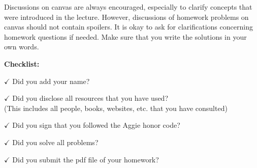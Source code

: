 \documentclass{article}
\theoremstyle{definition}
\newcommand{\checklist}{\noindent\textbf{Checklist:}
\begin{compactitem}[$\Box$] 
\item [$\checkmark$] Did you add your name? 
\item [$\checkmark$] Did you disclose all resources that you have used? \\
(This includes all people, books, websites, etc. that you have consulted)
\item [$\checkmark$] Did you sign that you followed the Aggie honor code? 
\item [$\checkmark$] Did you solve all problems? 
\item [$\checkmark$] Did you submit the pdf file of your homework?
\end{compactitem}
}
\begin{document}
Discussions on canvas are always encouraged, especially to clarify
concepts that were introduced in the lecture. However, discussions of
homework problems on canvas should not contain spoilers. It is okay to
ask for clarifications concerning homework questions if needed. Make
sure that you write the solutions in your own words. 


\medskip



\goodbreak
\checklist
\end{document}
